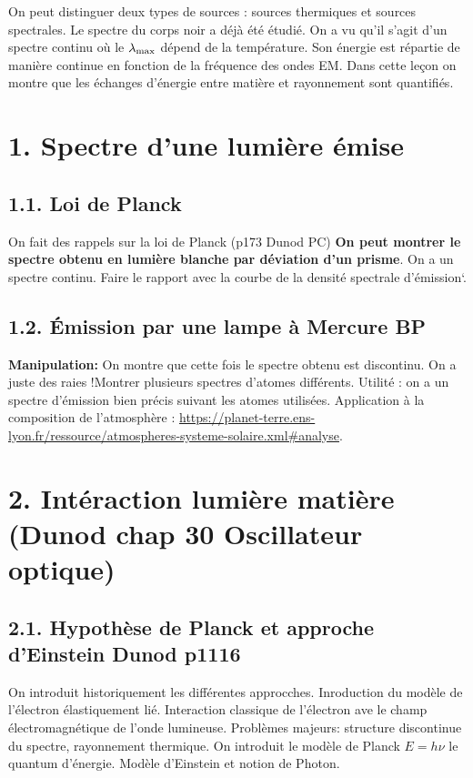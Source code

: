 \documentclass[french, a4paper, 10pt, twocolumn, landscape]{article}
\begin{document}
On peut distinguer deux types de sources : sources thermiques et sources spectrales. Le spectre du corps noir a déjà été étudié. On a vu qu'il s'agit d'un spectre continu où le $\lambda_{\rm max}$ dépend de la température. Son énergie est répartie de manière continue en fonction de la fréquence des ondes EM. Dans cette leçon on montre que les échanges d'énergie entre matière et rayonnement sont quantifiés.

\section*{1. Spectre d'une lumière émise}

\subsection*{1.1. Loi de Planck}

On fait des rappels sur la loi de Planck (p173 Dunod PC)
\textbf{On peut montrer le spectre obtenu en lumière blanche par déviation d'un prisme}. On a un spectre continu. Faire le rapport avec la courbe de la densité spectrale d'émission`.

\subsection*{1.2. Émission par une lampe à Mercure BP}

\textbf{Manipulation:} On montre que cette fois le spectre obtenu est discontinu. On a juste des raies !Montrer plusieurs spectres d'atomes différents.  Utilité : on a un spectre d'émission bien précis suivant les atomes utilisées. Application à la composition de l'atmosphère : \url{https://planet-terre.ens-lyon.fr/ressource/atmospheres-systeme-solaire.xml#analyse}. 

\section*{2. Intéraction lumière matière (Dunod chap 30 Oscillateur optique)}

\subsection*{2.1. Hypothèse de Planck et approche d'Einstein Dunod p1116}

On introduit historiquement les différentes approcches. Inroduction du modèle de l'électron élastiquement lié. Interaction classique de l'électron ave le champ électromagnétique de l'onde lumineuse. Problèmes majeurs: structure discontinue du spectre, rayonnement thermique. On introduit le modèle de Planck $E = h\nu$ le quantum d'énergie. Modèle d'Einstein et notion de Photon.
\end{document}
